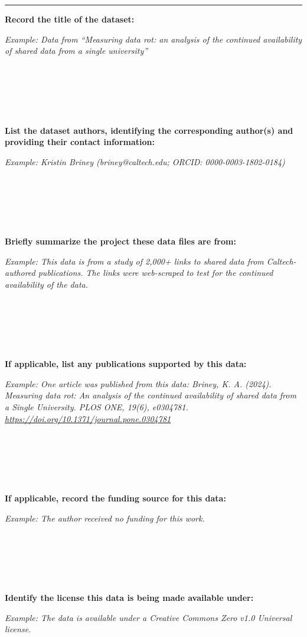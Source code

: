 \documentclass[
]{book}
\begin{document}
\begin{center}\rule{0.5\linewidth}{0.5pt}\end{center}

\textbf{Record the title of the dataset:}

\emph{Example: Data from ``Measuring data rot: an analysis of the continued availability of shared data from a single university''}

~

~

~

\textbf{List the dataset authors, identifying the corresponding author(s) and providing their contact information:}

\emph{Example: Kristin Briney (briney@caltech.edu; ORCID: 0000-0003-1802-0184)}

~

~

~

\textbf{Briefly summarize the project these data files are from:}

\emph{Example: This data is from a study of 2,000+ links to shared data from Caltech-authored publications. The links were web-scraped to test for the continued availability of the data.}

~

~

~

\textbf{If applicable, list any publications supported by this data:}

\emph{Example: One article was published from this data: Briney, K. A. (2024). Measuring data rot: An analysis of the continued availability of shared data from a Single University. PLOS ONE, 19(6), e0304781. \url{https://doi.org/10.1371/journal.pone.0304781}}

~

~

~

\textbf{If applicable, record the funding source for this data:}

\emph{Example: The author received no funding for this work.}

~

~

~

\textbf{Identify the license this data is being made available under:}

\emph{Example: The data is available under a Creative Commons Zero v1.0 Universal license.}

~
\end{document}
